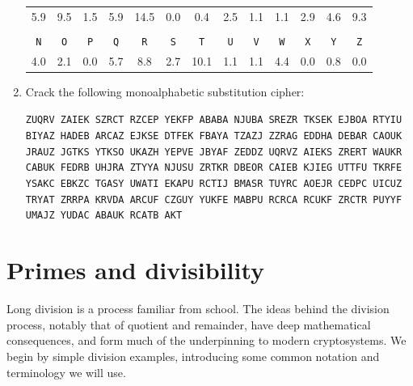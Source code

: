 \documentclass{book}
\theoremstyle{plain}
\theoremstyle{definition}
\newif\ifprintsolutions
\newcommand{\solution}[1]{\ifprintsolutions \begin{sloppypar}{\it #1}\end{sloppypar} \fi} %
\newcommand{\ciphertext}[1]{\texttt{#1}} %
\newcommand{\display}[1]{\begin{sloppypar}\setlength{\parindent}{0mm}#1\end{sloppypar}} %
\newcommand{\ciphertextspace}[1]{\begin{sloppypar}\doublespacing\Large\texttt{#1}\end{sloppypar}} %
\begin{document}
\begin{enumerate}
\begin{center}
\begin{tabular}{ccccccccccccc}
5.9 & 9.5 & 1.5 & 5.9 & 14.5 & 0.0 & 0.4 & 2.5 & 1.1 & 1.1 & 2.9 & 4.6 & 9.3 \\
\\
\ciphertext{N} & \ciphertext{O} & \ciphertext{P} & \ciphertext{Q} & \ciphertext{R} & \ciphertext{S} & \ciphertext{T} & \ciphertext{U} & \ciphertext{V} & \ciphertext{W} & \ciphertext{X} & \ciphertext{Y} & \ciphertext{Z} \\
4.0 & 2.1 & 0.0 & 5.7 & 8.8 & 2.7 & 10.1 & 1.1 & 1.1 & 4.4 & 0.0 & 0.8 & 0.0
\end{tabular}
\end{center}
\solution{Key DICKENSABF...: It was the best of times, it was the worst of times, it was the age of wisdom, it was the age of foolishness, it was the epoch of belief, it was the epoch of incredulity, it was the season of light, it was the season of darkness, it was the spring of hope, it was the winter of despair, we had everything before us, we had nothing before us, we were all going direct to heaven, we were all going direct the other way, in short, the period was so far like the present period.}
\item Crack the following monoalphabetic substitution cipher:
\display{\ciphertextspace{ZUQRV ZAIEK SZRCT RZCEP YEKFP ABABA NJUBA SREZR TKSEK EJBOA RTYIU BIYAZ HADEB ARCAZ EJKSE DTFEK FBAYA TZAZJ ZZRAG EDDHA DEBAR CAOUK JRAUZ JGTKS YTKSO UKAZH YEPVE JBYAF ZEDDZ UQRVZ AIEKS ZRERT WAUKR CABUK FEDRB UHJRA ZTYYA NJUSU ZRTKR DBEOR CAIEB KJIEG UTTFU TKRFE YSAKC EBKZC TGASY UWATI EKAPU RCTIJ BMASR TUYRC AOEJR CEDPC UICUZ TRYAT ZRRPA KRVDA ARCUF CZGUY YUKFE MABPU RCRCA RCUKF ZRCTR PUYYF UMAJZ YUDAC ABAUK RCATB AKT}} \solution{Key THISADFCULWYOKEGNBZRJMPQVX: Sixty seconds: that's how long we're required to stand on our metal circles before the sound of a gong releases us. Step off before the minute is up and land mines blow your legs off. Sixty seconds to take in the ring of tributes, all equidistant from the cornucopia, a giant golden horn shaped like a cone with a curved tail, the mouth of which is at least twenty feet high, spilling over with the things that will give us life here in the arena.}
\end{enumerate}

\chapter{Primes and divisibility}
Long division is a process familiar from school. The ideas behind the division process, notably that of quotient and remainder, have deep mathematical consequences, and form much of the underpinning to modern cryptosystems. We begin by simple division examples, introducing some common notation and terminology we will use.
\end{document}
